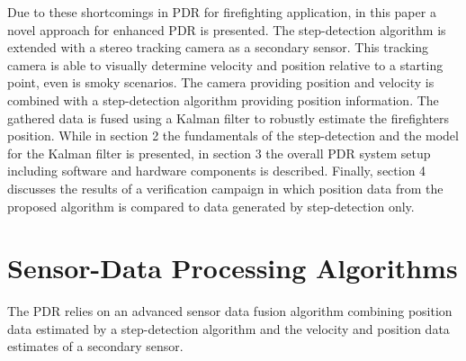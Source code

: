 \documentclass[engproc,conferenceproceedings,submit,pdftex,moreauthors]{Definitions/mdpi}
\begin{document}
Due to these shortcomings in PDR for firefighting application, in this paper  a novel approach for enhanced PDR is presented. The step-detection algorithm is extended with a stereo tracking camera as a secondary sensor. This tracking camera is able to visually determine velocity and position relative to a starting point, even is smoky scenarios. The camera providing position and velocity is combined with a step-detection algorithm providing position information. The gathered data is 
fused using a Kalman filter to robustly estimate the firefighters position. While in section 2 the fundamentals of the step-detection and the model for the Kalman filter is presented, in section 3 the overall PDR system setup including software and hardware components is described. Finally, section 4 discusses the results of a verification campaign in which position data from the proposed algorithm is compared to data generated by step-detection only.


\section{Sensor-Data Processing Algorithms}
The PDR relies on an advanced sensor data fusion algorithm combining position data estimated by a step-detection algorithm and the velocity and position data estimates of a secondary sensor.
\end{document}
